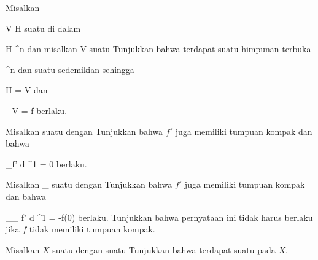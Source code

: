 {}
{

Misalkan

\mavergleichskette
{\vergleichskette
{ V
}
{ \subseteq }{ H
}
{  }{
}
{    }{
}
{   }{
}
}
{}{}{}
suatu
di dalam

\mavergleichskette
{\vergleichskette
{ H
}
{ \subset }{ \R^n
}
{  }{
}
{    }{
}
{   }{
}
}
{}{}{}
dan misalkan
 { V } {\R
} {}
suatu
Tunjukkan bahwa terdapat suatu himpunan terbuka

\mavergleichskette
{\vergleichskette
{ 
}
{ \subseteq }{ \R^n
}
{  }{
}
{    }{
}
{   }{
}
}
{}{}{}
dan suatu
 {} { \R
} {}
sedemikian sehingga

\mavergleichskette
{\vergleichskette
{  \cap H
}
{ = }{ V
}
{  }{
}
{    }{
}
{   }{
}
}
{}{}{}
dan

\mavergleichskette
{\vergleichskette
{  \vert_V
}
{ = }{ f
}
{  }{
}
{    }{
}
{   }{
}
}
{}{}{}
berlaku.

}
{} {}

{}
{

Misalkan
 {\R} {\R
} {}
suatu
dengan
Tunjukkan bahwa
$f'$ juga memiliki tumpuan kompak dan bahwa

\mavergleichskette
{\vergleichskette
{ \int_\R f' d \lambda^1
}
{ = }{ 0
}
{  }{
}
{    }{
}
{   }{
}
}
{}{}{}
berlaku.

}
{} {}

{}
{

Misalkan
 {\R_{}} {\R
} {}
suatu
dengan
Tunjukkan bahwa
$f'$ juga memiliki tumpuan kompak dan bahwa

\mavergleichskette
{\vergleichskette
{ \int_{\R_{} } f' d \lambda^1
}
{ = }{ -f(0)
}
{  }{
}
{    }{
}
{   }{
}
}
{}{}{}
berlaku. Tunjukkan bahwa pernyataan ini tidak harus berlaku jika $f$ tidak memiliki tumpuan kompak.

}
{} {}

{}
{

Misalkan $X$ suatu
dengan suatu
Tunjukkan bahwa terdapat suatu
pada $X$.

}
{} {}

